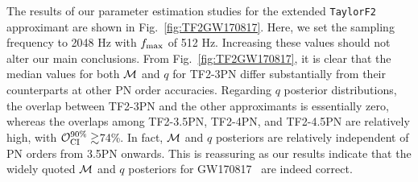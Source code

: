 \documentclass[aps,prd,twocolumn,superscriptaddress,groupedaddress,nofootinbib,showpacs,eqsecnum,useAms]{revtex4-2}
\begin{document}
The results of our parameter estimation studies for the extended \texttt{TaylorF2} approximant are shown in Fig.~\ref{fig:TF2GW170817}. Here, we set the sampling frequency to 2048 Hz with $f_{\rm max}$ of 512 Hz. Increasing these values should not alter our main conclusions. From Fig.~\ref{fig:TF2GW170817}, it is clear that the median values for both ${\cal M}$ and $q$ for TF2-3PN differ substantially from their counterparts at other PN order accuracies. 
Regarding $q$ posterior distributions, the overlap between TF2-3PN and the other approximants is essentially zero, whereas the overlaps among TF2-3.5PN, TF2-4PN, and TF2-4.5PN are relatively high, with ${\cal O}_{\rm CI}^{90\%}\gtrsim$74\%.
In fact, ${\cal M}$ and $q$ posteriors are relatively independent of PN orders from 3.5PN onwards.
This is reassuring as our results indicate that the widely quoted ${\cal M}$ and $q$  posteriors for GW170817~\cite{GW170817pe} are indeed correct.
\end{document}

